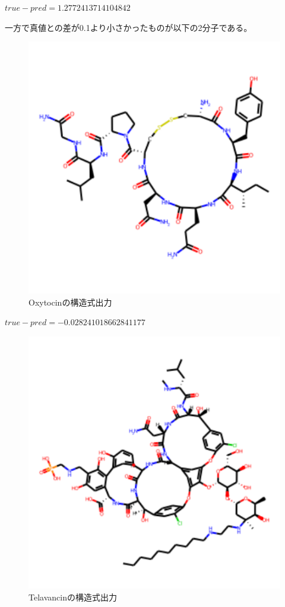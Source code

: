 \documentclass[a4j,11pt]{jarticle}
\begin{document}
$true - pred = 1.2772413714104842$\par
一方で真値との差が0.1より小さかったものが以下の2分子である。
\begin{figure}[H]
\centering
\includegraphics[scale=0.5]{./images/Oxytocin.pdf}
\caption{Oxytocinの構造式出力}
\label{fig:ex1_I_3}
\end{figure}
$true - pred = -0.028241018662841177$
\begin{figure}[H]
\centering
\includegraphics[scale=0.5]{./images/Telavancin.pdf}
\caption{Telavancinの構造式出力}
\label{fig:ex1_I_4}
\end{figure}
\end{document}
